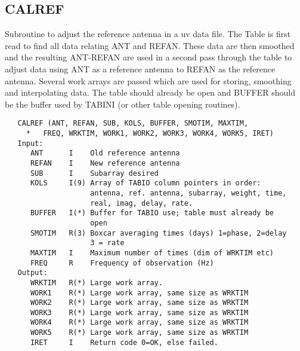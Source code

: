 \subsection{CALREF}
Subroutine to adjust the reference antenna in a uv data file.  The
Table is first read to find all data relating ANT and REFAN.  These
data are then smoothed and the resulting ANT-REFAN are used in a
second pass through the table to adjust data using ANT as a
reference antenna to REFAN as the reference antenna.
     Several work arrays are passed which are used for storing,
smoothing and interpolating data.
     The table should already be open and BUFFER should be the
buffer used by TABINI (or other table opening routines).
\begin{verbatim}
   CALREF (ANT, REFAN, SUB, KOLS, BUFFER, SMOTIM, MAXTIM,
     *   FREQ, WRKTIM, WORK1, WORK2, WORK3, WORK4, WORK5, IRET)
   Input:
      ANT      I    Old reference antenna
      REFAN    I    New reference antenna
      SUB      I    Subarray desired
      KOLS     I(9) Array of TABIO column pointers in order:
                    antenna, ref. antenna, subarray, weight, time,
                    real, imag, delay, rate.
      BUFFER   I(*) Buffer for TABIO use; table must already be
                    open
      SMOTIM   R(3) Boxcar averaging times (days) 1=phase, 2=delay
                    3 = rate
      MAXTIM   I    Maximum number of times (dim of WRKTIM etc)
      FREQ     R    Frequency of observation (Hz)
   Output:
      WRKTIM   R(*) Large work array.
      WORK1    R(*) Large work array, same size as WRKTIM
      WORK2    R(*) Large work array, same size as WRKTIM
      WORK3    R(*) Large work array, same size as WRKTIM
      WORK4    R(*) Large work array, same size as WRKTIM
      WORK5    R(*) Large work array, same size as WRKTIM
      IRET     I    Return code 0=OK, else failed.
\end{verbatim}

